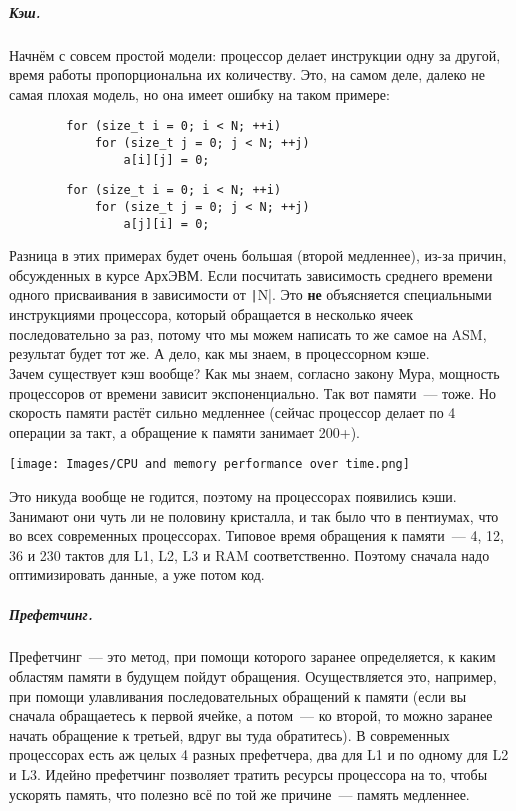 \documentclass{article}
\begin{document}
    \subparagraph{Кэш.}
    Начнём с совсем простой модели: процессор делает инструкции одну за другой, время работы пропорциональна их количеству. Это, на самом деле, далеко не самая плохая модель, но она имеет ошибку на таком примере:
    \begin{multicols}{2}
    \begin{verbatim}
        for (size_t i = 0; i < N; ++i)
            for (size_t j = 0; j < N; ++j)
                a[i][j] = 0;
    \end{verbatim}
    \columnbreak
    \begin{verbatim}
        for (size_t i = 0; i < N; ++i)
            for (size_t j = 0; j < N; ++j)
                a[j][i] = 0;
    \end{verbatim}
    \end{multicols}\noindent
    Разница в этих примерах будет очень большая (второй медленнее), из-за причин, обсужденных в курсе АрхЭВМ. Если посчитать зависимость среднего времени одного присваивания в зависимости от \texttt|N|. Это \textbf{не} объясняется специальными инструкциями процессора, который обращается в несколько ячеек последовательно за раз, потому что мы можем написать то же самое на ASM, результат будет тот же. А дело, как мы знаем, в процессорном кэше.\\
    Зачем существует кэш вообще? Как мы знаем, согласно закону Мура, мощность процессоров от времени зависит экспоненциально. Так вот памяти~--- тоже. Но скорость памяти растёт сильно медленнее (сейчас процессор делает по 4 операции за такт, а обращение к памяти занимает 200+).
    \begin{center}
        \texttt{[image: Images/CPU and memory performance over time.png]}
    \end{center}
    Это никуда вообще не годится, поэтому на процессорах появились кэши. Занимают они чуть ли не половину кристалла, и так было что в пентиумах, что во всех современных процессорах. Типовое время обращения к памяти~--- 4, 12, 36 и 230 тактов для L1, L2, L3 и RAM соответственно. Поэтому сначала надо оптимизировать данные, а уже потом код.
    \subparagraph{Префетчинг.}
    Префетчинг~--- это метод, при помощи которого заранее определяется, к каким областям памяти в будущем пойдут обращения. Осуществляется это, например, при помощи улавливания последовательных обращений к памяти (если вы сначала обращаетесь к первой ячейке, а потом~--- ко второй, то можно заранее начать обращение к третьей, вдруг вы туда обратитесь). В современных процессорах есть аж целых 4 разных префетчера, два для L1 и по одному для L2 и L3. Идейно префетчинг позволяет тратить ресурсы процессора на то, чтобы ускорять память, что полезно всё по той же причине~--- память медленнее.
\end{document}

